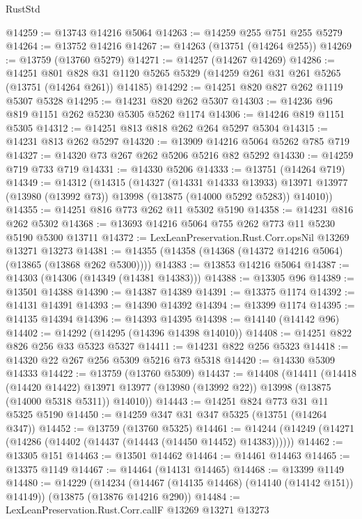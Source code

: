 \begin{lexlean}{RustStd}
\begin{coremodule}
@14259 := @13743 @14216 @5064
@14263 := @14259 @255 @751 @255 @5279
@14264 := @13752 @14216
@14267 := @14263 (@13751 (@14264 @255))
@14269 := @13759 (@13760 @5279)
@14271 := @14257 (@14267 @14269)
@14286 := @14251
    @801
    @828
    @31
    @1120
    @5265
    @5329
    (@14259 @261 @31 @261 @5265 (@13751 (@14264 @261)) @14185)
@14292 := @14251 @820 @827 @262 @1119 @5307 @5328
@14295 := @14231 @820 @262 @5307
@14303 := @14236 @96 @819 @1151 @262 @5230 @5305 @5262 @1174
@14306 := @14246 @819 @1151 @5305
@14312 := @14251 @813 @818 @262 @264 @5297 @5304
@14315 := @14231 @813 @262 @5297
@14320 := @13909 @14216 @5064 @5262 @785 @719
@14327 := @14320 @73 @267 @262 @5206 @5216 @82 @5292
@14330 := @14259 @719 @733 @719
@14331 := @14330 @5206
@14333 := @13751 (@14264 @719)
@14349 := @14312
    (@14315
      (@14327
        (@14331 @14333 @13933)
        @13971
        @13977
        (@13980 (@13992 @73))
        @13998
        (@13875 (@14000 @5292 @5283))
        @14010))
@14355 := @14251 @816 @773 @262 @11 @5302 @5190
@14358 := @14231 @816 @262 @5302
@14368 := @13693 @14216 @5064 @755 @262 @773 @11 @5230 @5190 @5300 @13711
@14372 := LexLeanPreservation.Rust.Corr.opsNil @13269 @13271 @13273
@14381 := @14355 (@14358 (@14368 (@14372 @14216 @5064) (@13865 (@13868 @262 @5300))))
@14383 := @13853 @14216 @5064
@14387 := @14303 (@14306 (@14349 (@14381 @14383)))
@14388 := @13305 @96
@14389 := @13501 @14388
@14390 := @14387 @14389
@14391 := @13375 @1174
@14392 := @14131 @14391
@14393 := @14390 @14392
@14394 := @13399 @1174
@14395 := @14135 @14394
@14396 := @14393 @14395
@14398 := @14140 (@14142 @96)
@14402 := @14292 (@14295 (@14396 @14398 @14010))
@14408 := @14251 @822 @826 @256 @33 @5323 @5327
@14411 := @14231 @822 @256 @5323
@14418 := @14320 @22 @267 @256 @5309 @5216 @73 @5318
@14420 := @14330 @5309 @14333
@14422 := @13759 (@13760 @5309)
@14437 := @14408
    (@14411
      (@14418
        (@14420 @14422)
        @13971
        @13977
        (@13980 (@13992 @22))
        @13998
        (@13875 (@14000 @5318 @5311))
        @14010))
@14443 := @14251 @824 @773 @31 @11 @5325 @5190
@14450 := @14259 @347 @31 @347 @5325 (@13751 (@14264 @347))
@14452 := @13759 (@13760 @5325)
@14461 := @14244 (@14249 (@14271 (@14286 (@14402 (@14437 (@14443 (@14450 @14452) @14383))))))
@14462 := @13305 @151
@14463 := @13501 @14462
@14464 := @14461 @14463
@14465 := @13375 @1149
@14467 := @14464 (@14131 @14465)
@14468 := @13399 @1149
@14480 := @14229
    (@14234 (@14467 (@14135 @14468) (@14140 (@14142 @151)) @14149))
    (@13875 (@13876 @14216 @290))
@14484 := LexLeanPreservation.Rust.Corr.callF @13269 @13271 @13273

\end{coremodule}
\end{lexlean}
